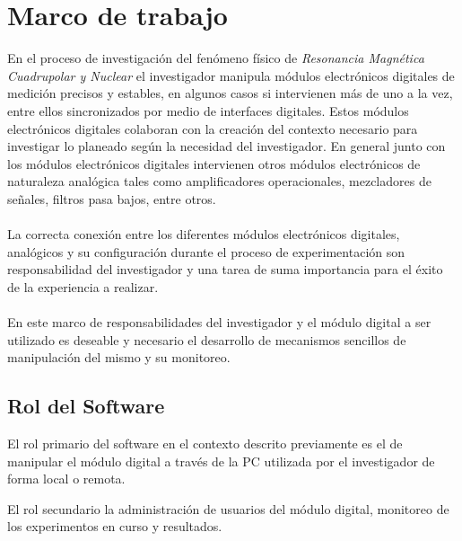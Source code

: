 \section{Marco de trabajo}

En el proceso de investigaci\'on del fen\'omeno f\'isico de \textit{Resonancia Magn\'etica Cuadrupolar y Nuclear} 
el investigador manipula m\'odulos electr\'onicos digitales de medici\'on precisos 
y estables, en algunos casos si intervienen m\'as de uno a la vez, entre ellos sincronizados 
por medio de interfaces digitales. 
Estos m\'odulos electr\'onicos digitales colaboran con la creaci\'on del contexto necesario 
para investigar lo planeado seg\'un la necesidad del investigador.
En general junto con los m\'odulos electr\'onicos digitales intervienen otros m\'odulos electr\'onicos de 
naturaleza anal\'ogica tales como amplificadores operacionales, mezcladores de señales, 
filtros pasa bajos, entre otros.
\\\\
La correcta conexi\'on entre los diferentes m\'odulos electr\'onicos digitales, 
anal\'ogicos y su configuraci\'on durante el proceso de experimentaci\'on son 
responsabilidad del investigador y una tarea de suma importancia para el \'exito de la experiencia a realizar.
\\\\
En este marco de responsabilidades del investigador y el m\'odulo digital a ser utilizado es deseable 
y necesario el desarrollo de mecanismos sencillos de manipulaci\'on del mismo y su monitoreo.

\subsection{Rol del Software}

El rol primario del software en el contexto descrito previamente es el de manipular 
el m\'odulo digital a trav\'es de la PC utilizada por el investigador de forma local o remota.

El rol secundario la administraci\'on de usuarios del m\'odulo digital, monitoreo de los experimentos en curso y resultados.

\newpage

